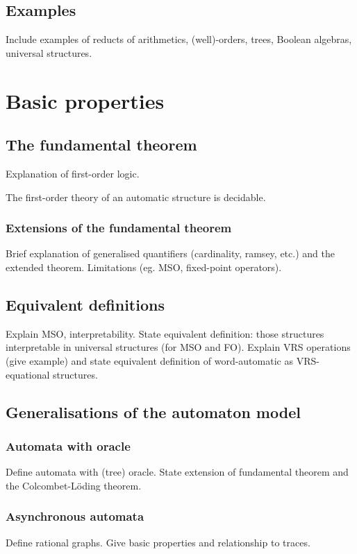 \documentclass{book}
\begin{document}
\subsection{Examples}
Include examples of reducts of arithmetics, (well)-orders, trees, Boolean algebras, universal structures.

\section{Basic properties}
\subsection{The fundamental theorem}
Explanation of first-order logic.

\begin{theorem}
The first-order theory of an automatic structure is decidable.
\end{theorem}

\subsubsection{Extensions of the fundamental theorem}

Brief explanation of generalised quantifiers (cardinality, ramsey, etc.) and the extended theorem.
Limitations (eg. MSO, fixed-point operators).
\subsection{Equivalent definitions}
Explain MSO, interpretability. 
State equivalent definition: those structures interpretable in universal structures (for MSO and FO).  
Explain VRS operations (give example) and state equivalent definition of
word-automatic as VRS-equational structures. 

\subsection{Generalisations of the automaton model}
\subsubsection{Automata with oracle}
Define automata with (tree) oracle. State extension of fundamental theorem and the Colcombet-L\"oding theorem.

\subsubsection{Asynchronous automata}
Define rational graphs. Give basic properties and relationship to traces.
\end{document}
